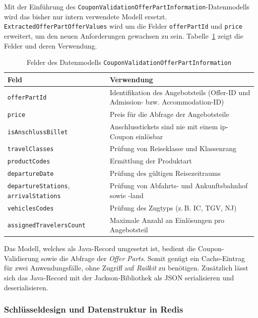 Mit der Einführung des \texttt{CouponValidationOfferPartInformation}-Datenmodells wird das bisher nur intern verwendete Modell ersetzt. \texttt{ExtractedOfferPartOfferValues} wird um die Felder \texttt{offerPartId} und \texttt{price} erweitert, um den neuen Anforderungen gewachsen zu sein. Tabelle~\ref{tab:datenmodell} zeigt die Felder und deren Verwendung.

\begin{table}[htbp]
    \centering
    \begin{tabular}{p{} p{}}
        \hline
        \textbf{Feld} & \textbf{Verwendung} \\
        \hline
        \texttt{offerPartId} & Identifikation des Angebotsteils (Offer-ID und Admission- bzw. Accommodation-ID) \\
        \texttt{price} & Preis für die Abfrage der Angebotsteile \\
        \texttt{isAnschlussBillet} & Anschlusstickets sind nie mit einem \ac{ip}-Coupon einlösbar \\
        \texttt{travelClasses} & Prüfung von Reiseklasse und Klassenrang \\
        \texttt{productCodes} & Ermittlung der Produktart \\
        \texttt{departureDate} & Prüfung des gültigen Reisezeitraums \\
        \texttt{departureStations}, \texttt{arrivalStations} & Prüfung von Abfahrts- und Ankunftsbahnhof sowie -land \\
        \texttt{vehiclesCodes} & Prüfung des Zugtyps (z.\,B. IC, TGV, NJ) \\
        \texttt{assignedTravelersCount} & Maximale Anzahl an Einlösungen pro Angebotsteil \\
        \hline
    \end{tabular}
    \caption{Felder des Datenmodells \texttt{CouponValidationOfferPartInformation}}
    \label{tab:datenmodell}
\end{table}

Das Modell, welches als Java-Record umgesetzt ist, bedient die Coupon-Validierung sowie die Abfrage der \textit{Offer Parts}. Somit genügt ein Cache-Eintrag für zwei Anwendungsfälle, ohne Zugriff auf \textit{Railkit} zu benötigen. Zusätzlich lässt sich das Java-Record mit der Jackson-Bibliothek als JSON serialisieren und deserialisieren. %

\subsubsection{Schlüsseldesign und Datenstruktur in Redis}
\label{subsubsec:schluessel}

